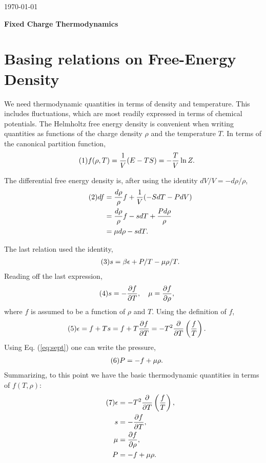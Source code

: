 \documentclass[12pt]{article}
\numberwithin{equation}{section}
\numberwithin{figure}{section}
\newcommand\eqnumber{\addtocounter{equation}{1}\tag{\theequation}}
\begin{document}
\today\\

\centerline{\bf \large Fixed Charge Thermodynamics}

\section{Basing relations on Free-Energy Density}

We need thermodynamic quantities in terms of density and temperature. This includes fluctuations, which are most readily expressed in terms of chemical potentials. The Helmholtz free energy density is convenient when writing quantities as functions of the charge density $\rho$ and the temperature $T$. In terms of the canonical partition function,
\begin{align*}\eqnumber
f(\rho,T)&=\frac{1}{V}(E-TS)=-\frac{T}{V}\ln Z.
\end{align*}

The differential free energy density is, after using the identity $dV/V=-d\rho/\rho$,
\begin{align*}\eqnumber
df&=\frac{d\rho}{\rho}f+\frac{1}{V}(-SdT-PdV)\\
&=\frac{d\rho}{\rho}f-sdT+\frac{Pd\rho}{\rho}\\
&=\mu d\rho-sdT.
\end{align*}

The last relation used the identity,
\begin{align*}\eqnumber\label{eq:sept}
s=\beta\epsilon+P/T-\mu\rho/T.
\end{align*}
Reading off the last expression,
\begin{align*}\eqnumber
s&=-\frac{\partial f}{\partial T},~~~\mu=\frac{\partial f}{\partial\rho},
\end{align*}
where $f$ is assumed to be a function of $\rho$ and $T$. Using the definition of $f$,
\begin{align*}\eqnumber
\epsilon&=f+Ts=f+T\frac{\partial f}{\partial T}=-T^2\frac{\partial}{\partial T}\left(\frac{f}{T}\right).
\end{align*}
Using Eq. (\ref{eq:sept}) one can write the pressure,
\begin{align*}\eqnumber
P&=-f+\mu\rho.
\end{align*}
Summarizing, to this point we have the basic thermodynamic quantities in terms of $f(T,\rho)$:
\begin{align*}\eqnumber
\epsilon&=-T^2\frac{\partial}{\partial T}\left(\frac{f}{T}\right),\\
s&=-\frac{\partial f}{\partial T},\\
\mu&=\frac{\partial f}{\partial \rho},\\
P&=-f+\mu\rho.
\end{align*}
\end{document}
